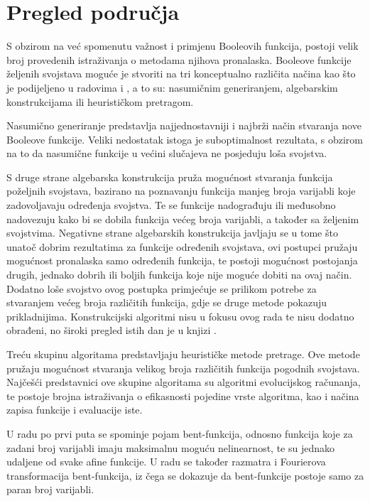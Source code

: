 \chapter{Pregled područja}
S obzirom na već spomenutu važnost i primjenu Booleovih funkcija, postoji velik broj provedenih istraživanja o metodama njihova pronalaska.
Booleove funkcije željenih svojstava moguće je stvoriti na tri konceptualno različita načina kao što je podijeljeno u radovima \cite{picek2016new} i \cite{CryptographicBoolean}, a to su: nasumičnim generiranjem, algebarskim konstrukcijama ili heurističkom pretragom.

Nasumično generiranje predstavlja najjednostavniji i najbrži način stvaranja nove Booleove funkcije.
Veliki nedostatak istoga je suboptimalnost rezultata, s obzirom na to da nasumične funkcije u većini slučajeva ne posjeduju loša svojstva.

S druge strane algebarska konstrukcija pruža mogućnost stvaranja funkcija poželjnih svojstava, bazirano na poznavanju funkcija manjeg broja varijabli koje zadovoljavaju određenja svojstva.
Te se funkcije nadograđuju ili međusobno nadovezuju kako bi se dobila funkcija većeg broja varijabli, a također sa željenim svojstvima.
Negativne strane algebarskih konstrukcija javljaju se u tome što unatoč dobrim rezultatima za funkcije određenih svojstava, ovi postupci pružaju mogućnost pronalaska samo određenih funkcija, te postoji mogućnost postojanja drugih, jednako dobrih ili boljih funkcija koje nije moguće dobiti na ovaj način.
Dodatno loše svojstvo ovog postupka primjećuje se prilikom potrebe za stvaranjem većeg broja različitih funkcija, gdje se druge metode pokazuju prikladnijima.
Konstrukcijski algoritmi nisu u fokusu ovog rada te nisu dodatno obrađeni, no široki pregled istih dan je u knjizi \cite{CryptographicBooleanFunctions}.

Treću skupinu algoritama predstavljaju heurističke metode pretrage.
Ove metode pružaju mogućnost stvaranja velikog broja različitih funkcija pogodnih svojstava.
Najčešći predstavnici ove skupine algoritama su algoritmi evolucijskog računanja, te postoje brojna istraživanja o efikasnosti pojedine vrste algoritma, kao i načina zapisa funkcije i evaluacije iste.

U radu \cite{OnBentFunctions} po prvi puta se spominje pojam bent-funkcija, odnosno funkcija koje za zadani broj varijabli imaju maksimalnu moguću nelinearnost, te su jednako udaljene od svake afine funkcije.
U radu se također razmatra i Fourierova transformacija bent-funkcija, iz čega se dokazuje da bent-funkcije postoje samo za paran broj varijabli.

